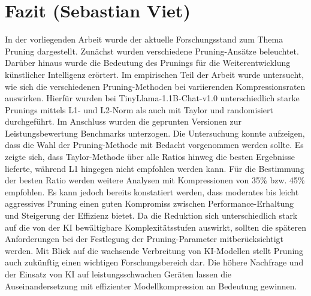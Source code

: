 \section{Fazit (Sebastian Viet)}

In der vorliegenden Arbeit wurde der aktuelle Forschungsstand zum Thema Pruning
dargestellt. Zunächst wurden verschiedene Pruning-Ansätze beleuchtet. Darüber
hinaus wurde die Bedeutung des Prunings für die Weiterentwicklung künstlicher
Intelligenz erörtert. Im empirischen Teil der Arbeit wurde untersucht, wie sich
die verschiedenen Pruning-Methoden bei variierenden Kompressionsraten
auswirken. Hierfür wurden bei TinyLlama-1.1B-Chat-v1.0 unterschiedlich starke
Prunings mittels L1- und L2-Norm als auch mit Taylor und randomisiert
durchgeführt. Im Anschluss wurden die geprunten Versionen zur
Leistungsbewertung Benchmarks unterzogen. Die Untersuchung konnte aufzeigen,
dass die Wahl der Pruning-Methode mit Bedacht vorgenommen werden sollte. Es
zeigte sich, dass Taylor-Methode über alle Ratios hinweg die besten Ergebnisse
lieferte, während L1 hingegen nicht empfohlen werden kann. Für die Bestimmung
der besten Ratio werden weitere Analysen mit Kompressionen von 35\% bzw. 45\%
empfohlen. Es kann jedoch bereits konstatiert werden, dass moderates bis leicht
aggressives Pruning einen guten Kompromiss zwischen Performance-Erhaltung und
Steigerung der Effizienz bietet. Da die Reduktion sich unterschiedlich stark
auf die von der KI bewältigbare Komplexitätsstufen auswirkt, sollten die
späteren Anforderungen bei der Festlegung der Pruning-Parameter
mitberücksichtigt werden. Mit Blick auf die wachsende Verbreitung von
KI-Modellen stellt Pruning auch zukünftig einen wichtigen Forschungsbereich
dar. Die höhere Nachfrage und der Einsatz von KI auf leistungsschwachen Geräten
lassen die Auseinandersetzung mit effizienter Modellkompression an Bedeutung
gewinnen.

